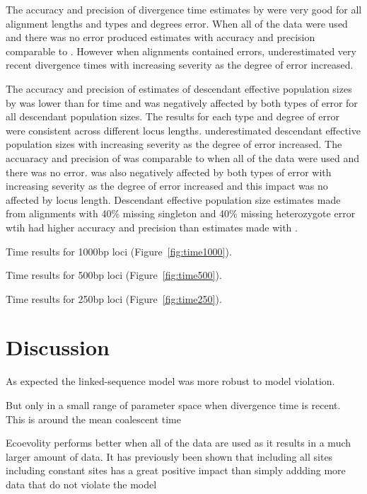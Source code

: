 The accuracy and precision of divergence time estimates by \beast were very good for all 
alignment lengths and types and degrees error. 
When all of the data were used and there was no error \ecoevolity produced 
estimates with accuracy and precision comparable to \beast. 
However when alignments contained errors, \ecoevolity underestimated very recent 
divergence times with increasing severity as the degree of error increased. 

The accuracy and precision of estimates of descendant effective population sizes 
by \beast was lower than for time and was negatively affected by both types
of error for all descendant population sizes.
The results for each type and degree of error were consistent across different 
locus lengths.
\beast underestimated descendant effective population sizes with increasing severity 
as the degree of error increased.
The accuaracy and precision of \ecoevolity was comparable to \beast when all of 
the data were used and there was no error. \ecoevolity was also negatively affected
by both types of error with increasing severity as the degree of error increased
and this impact was no affected by locus length.
Descendant effective population size estimates made from alignments with 40\%
missing singleton and 40\% missing heterozygote error wtih \beast had higher
accuracy and precision than estimates made with \ecoevolity.   








Time results for 1000bp loci (Figure~\ref{fig:time1000}).

Time results for 500bp loci (Figure~\ref{fig:time500}).

Time results for 250bp loci (Figure~\ref{fig:time250}).

\section{Discussion}

As expected the linked-sequence model was more robust to model violation.

But only in a small range of parameter space when divergence time is recent. This
is around the mean coalescent time

Ecoevolity performs better when all of the data are used as it results in a much larger 
amount of data. It has previously been shown that including all sites including 
constant sites has a great positive impact than simply addding more data that 
do not violate the model \citep{Oaks2018ecoevolity}

